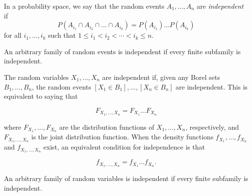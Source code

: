 \documentclass{article}
\begin{document}
In a probability space, we say that the random events $A_1,\dots,A_n$ are 
\emph{independent} if
$$ P(A_{i_1}\cap A_{i_2}\cap\dots\cap A_{i_k}) = P(A_{i_1})\dots P(A_{i_k}) $$
for all $i_1,\dots,i_k$ such that $1\leq i_1<i_2<\cdots<i_k\leq n$.

An arbitrary family of random events is independent if every finite subfamily is independent.

The random variables $X_1,\dots,X_n$ are independent if, given any Borel sets $B_1,\dots,B_n$, the random events $[X_1\in B_1],\dots,[X_n\in B_n]$ are independent. This is equivalent to saying that 

\[F_{X_1,\dots,X_n} = F_{X_1}\dots F_{X_n}\]

where $F_{X_1},\dots, F_{X_n}$ are the distribution functions of $X_1,\dots, X_n$, respectively, and $F_{X_1,\dots,X_n}$ is the joint distribution function. When the density functions $f_{X_1},\dots,f_{X_n}$ and $f_{X_1,\dots,X_n}$ exist, an equivalent condition for independence is that

\[f_{X_1,\dots,X_n} = f_{X_1}\dots f_{X_n}.\]

An arbitrary family of random variables is independent if every finite subfamily is independent.
\end{document}

